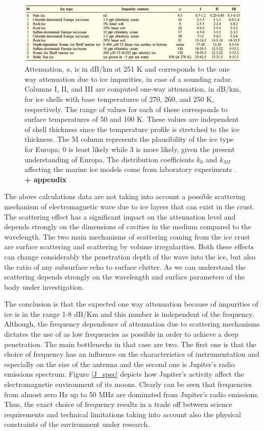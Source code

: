 \documentclass{book}
\begin{document}
\begin{figure}[ht]
\centering
\label{impurities}
\includegraphics[width=1\textwidth]{figures/Moore2.jpg}
\caption{Attenuation, $a$, is in dB/km at 251 K and corresponds to the one way attenuation due to  ice impurities, in case of a sounding radar. Columns I, II, and III are computed one-way attenuation, in dB/km, for ice shells with base temperatures of 270, 260, and 250 K, respectively. The range of values for each of these corresponds to surface temperatures of 50 and 100 K. These values are independent of shell thickness since the temperature profile is stretched to the ice thickness. The M column represents the plausibility of the ice type for Europa; 0 is least likely while 3 is more likely, given the present understanding
of Europa. The distribution coefficients $k_{0}$ and $k_{MI}$ affecting the marine ice models come from laboratory experiments \cite{Moore_2000}. \textbf{+ appendix}}
\end{figure}
The above calculations data are not taking into account a possible scattering mechanism of electromagnetic wave due to ice layers that can exist in the crust. The scattering effect has a significant impact on the attenuation level and depends strongly on the dimensions of cavities in the medium compared to the wavelength. The two main mechanisms of scattering coming from the ice crust are surface scattering and scattering by volume irregularities. Both these effects can change considerably the penetration depth of the wave into the ice, but also the ratio of any subsurface echo to surface clutter. As we can understand the scattering depends strongly on the wavelength and surface parameters of the body under investigation. 

The conclusion is that the expected one way attenuation because of impurities of ice is in the range 1-8 dB/Km and this number is independent of the frequency. Although, the frequency dependence of attenuation due to scattering mechanisms dictates the use of as low frequencies as possible in order to achieve a deep penetration. The main bottlenecks in that case are two. The first one is that the choice of frequency has an influence on the characteristics of instrumentation and especially on the size of the antenna and the second one is Jupiter's radio emissions spectrum. Figure \ref{J_spec} depicts how Jupiter's activity affect the electromagnetic environment of its moons. Clearly can be seen that frequencies from almost zero Hz up to 50 MHz are dominated from Jupiter's radio emissions. Thus, the exact choice of frequency results in a trade off between science requirements and technical limitations taking into account also the physical constraints of the environment under research. 
\end{document}
